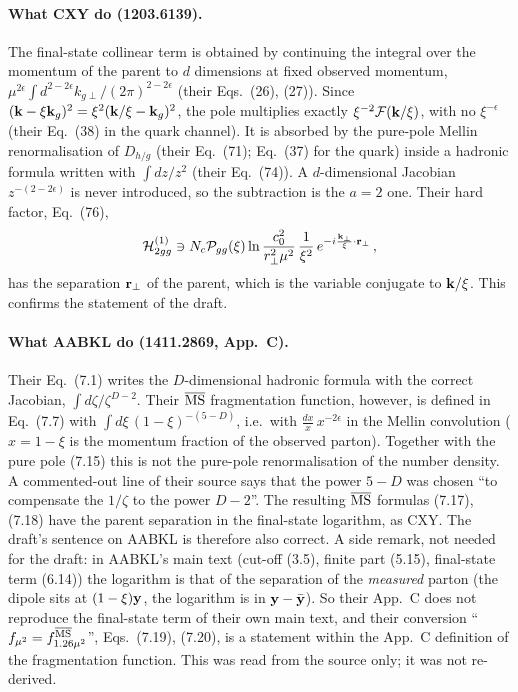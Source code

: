 \paragraph{What CXY do (1203.6139).} The final-state collinear term is obtained by continuing the integral over the momentum of the parent to $d$ dimensions at fixed observed momentum, $\mu^{2\epsilon}\int d^{2-2\epsilon}k_{g\perp}/(2\pi)^{2-2\epsilon}$ (their Eqs.~(26), (27)). Since $(\mathbf{k}-\xi\mathbf{k}_g)^2=\xi^2(\mathbf{k}/\xi-\mathbf{k}_g)^2$, the pole multiplies exactly $\xi^{-2}\mathcal F(\mathbf{k}/\xi)$, with no $\xi^{-\epsilon}$ (their Eq.~(38) in the quark channel). It is absorbed by the pure-pole Mellin renormalisation of $D_{h/g}$ (their Eq.~(71); Eq.~(37) for the quark) inside a hadronic formula written with $\int dz/z^2$ (their Eq.~(74)). A $d$-dimensional Jacobian $z^{-(2-2\epsilon)}$ is never introduced, so the subtraction is the $a=2$ one. Their hard factor, Eq.~(76),
\[
\mathcal H^{(1)}_{2gg}\ni N_c\mathcal P_{gg}(\xi)\ln\frac{c_0^2}{r_\perp^2\mu^2}\,\frac{1}{\xi^2}\,e^{-i\frac{\mathbf{k}_\perp}{\xi}\cdot\mathbf{r}_\perp}\,,
\]
has the separation $\mathbf{r}_\perp$ of the parent, which is the variable conjugate to $\mathbf{k}/\xi$. This confirms the statement of the draft.

\paragraph{What AABKL do (1411.2869, App.~C).} Their Eq.~(7.1) writes the $D$-dimensional hadronic formula with the correct Jacobian, $\int d\zeta/\zeta^{D-2}$. Their $\overline{\rm MS}$ fragmentation function, however, is defined in Eq.~(7.7) with $\int d\xi\,(1-\xi)^{-(5-D)}$, i.e.\ with $\frac{dx}{x}\,x^{-2\epsilon}$ in the Mellin convolution ($x=1-\xi$ is the momentum fraction of the observed parton). Together with the pure pole (7.15) this is not the pure-pole renormalisation of the number density. A commented-out line of their source says that the power $5-D$ was chosen ``to compensate the $1/\zeta$ to the power $D-2$''. The resulting $\overline{\rm MS}$ formulas (7.17), (7.18) have the parent separation in the final-state logarithm, as CXY. The draft's sentence on AABKL is therefore also correct. A side remark, not needed for the draft: in AABKL's main text (cut-off (3.5), finite part (5.15), final-state term (6.14)) the logarithm is that of the separation of the \emph{measured} parton (the dipole sits at $(1-\xi)\mathbf{y}$, the logarithm is in $\mathbf{y}-\bar{\mathbf{y}}$). So their App.~C does not reproduce the final-state term of their own main text, and their conversion ``$f_{\mu^2}=f^{\overline{\rm MS}}_{1.26\mu^2}$'', Eqs.~(7.19), (7.20), is a statement within the App.~C definition of the fragmentation function. This was read from the source only; it was not re-derived.

